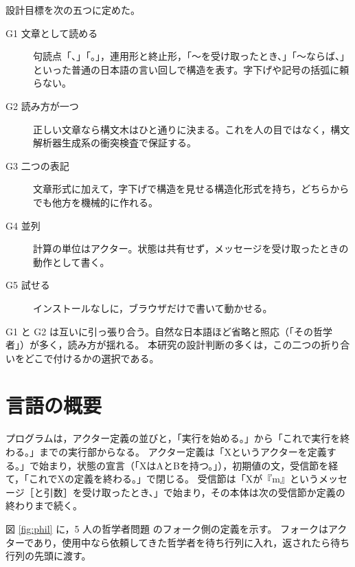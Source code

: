 \documentclass[a4paper,10pt]{ltjsarticle}
\begin{document}
設計目標を次の五つに定めた。
\begin{description}
\item[G1 文章として読める] 句読点「、」「。」，連用形と終止形，「〜を受け取ったとき、」「〜ならば、」といった普通の日本語の言い回しで構造を表す。字下げや記号の括弧に頼らない。
\item[G2 読み方が一つ] 正しい文章なら構文木はひと通りに決まる。これを人の目ではなく，構文解析器生成系の衝突検査で保証する。
\item[G3 二つの表記] 文章形式に加えて，字下げで構造を見せる構造化形式を持ち，どちらからでも他方を機械的に作れる。
\item[G4 並列] 計算の単位はアクター。状態は共有せず，メッセージを受け取ったときの動作として書く。
\item[G5 試せる] インストールなしに，ブラウザだけで書いて動かせる。
\end{description}

G1 と G2 は互いに引っ張り合う。自然な日本語ほど省略と照応（「その哲学者」）が多く，読み方が揺れる。
本研究の設計判断の多くは，この二つの折り合いをどこで付けるかの選択である。

\section{言語の概要}\label{sec:lang}

プログラムは，アクター定義の並びと，「実行を始める。」から「これで実行を終わる。」までの実行部からなる。
アクター定義は「Xというアクターを定義する。」で始まり，状態の宣言（「XはAとBを持つ。」），初期値の文，受信節を経て，「これでXの定義を終わる。」で閉じる。
受信節は「Xが『m』というメッセージ［と引数］を受け取ったとき、」で始まり，その本体は次の受信節か定義の終わりまで続く。

図 \ref{fig:phil} に，5 人の哲学者問題 \cite{dijkstra71} のフォーク側の定義を示す。
フォークはアクターであり，使用中なら依頼してきた哲学者を待ち行列に入れ，返されたら待ち行列の先頭に渡す。
\end{document}
